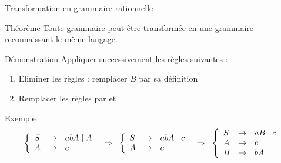 
\begingroup

\begin{frame}{Transformation en grammaire rationnelle}
  \begin{block}{Théorème}
    Toute grammaire  peut être transformée en une
    grammaire  reconnaissant le même langage. 
  \end{block}
  
  \begin{block}{Démonstration}
    Appliquer successivement les règles suivantes :
    \begin{enumerate}
    \item Eliminer les règles  : remplacer $B$ par sa définition
    \item Remplacer les règles  par  et 
    \end{enumerate}
  \end{block}
  
  \begin{exampleblock}{Exemple}
    \vspace{-5mm}
    $$
    \left\{\begin{array}{lll}
    S &\rightarrow& abA \;|\; A \\
    A &\rightarrow& c\\
    \end{array}\right.
    \hspace{2mm}\Rightarrow\hspace{2mm}
    \left\{\begin{array}{lll}
    S &\rightarrow& abA \;|\; c \\
    A &\rightarrow& c\\
    \end{array}\right.
    \hspace{2mm}\Rightarrow\hspace{2mm}
    \left\{\begin{array}{lll}
    S &\rightarrow& aB \;|\; c \\
    A &\rightarrow& c\\
    B &\rightarrow& bA\\
    \end{array}\right.$$
  \end{exampleblock}
\end{frame}

\endgroup
